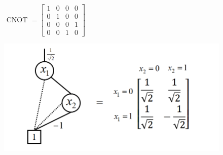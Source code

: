 \documentclass[aspectratio=1610,18pt]{ctexbeamer}
\begin{document}
\begin{frame}
  \begin{figure}
    \centering
    \begin{minipage}[t]{0.48\textwidth}
    \centering
    \end{minipage}
    \begin{minipage}[t]{0.48\textwidth}
    \centering
    $\text { CNOT }=\left[\begin{array}{llll}
      1 & 0 & 0 & 0 \\
      0 & 1 & 0 & 0 \\
      0 & 0 & 0 & 1 \\
      0 & 0 & 1 & 0
      \end{array}\right]$
    \end{minipage}
  \end{figure}
\end{frame}
\begin{frame}
  \begin{figure}
    \includegraphics[width = .8\textwidth]{TDD_H_gate2.png}
  \end{figure}
\end{frame}
\end{document}
